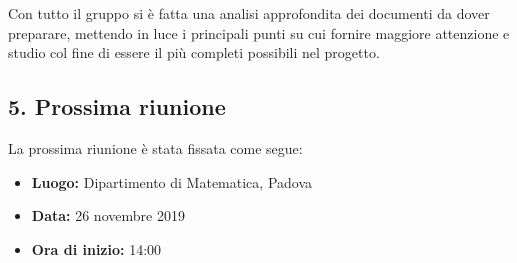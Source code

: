 Con tutto il gruppo si è fatta una analisi approfondita dei documenti da dover preparare, mettendo in luce i principali punti su cui fornire maggiore attenzione e studio col fine di essere il più completi possibili nel progetto.

\subsection*{5. Prossima riunione}

La prossima riunione è stata fissata come segue:
\begin{itemize}
	\item \textbf{Luogo:} Dipartimento di Matematica, Padova
	\item \textbf{Data:} 26 novembre 2019
	\item \textbf{Ora di inizio:} 14:00
\end{itemize}
